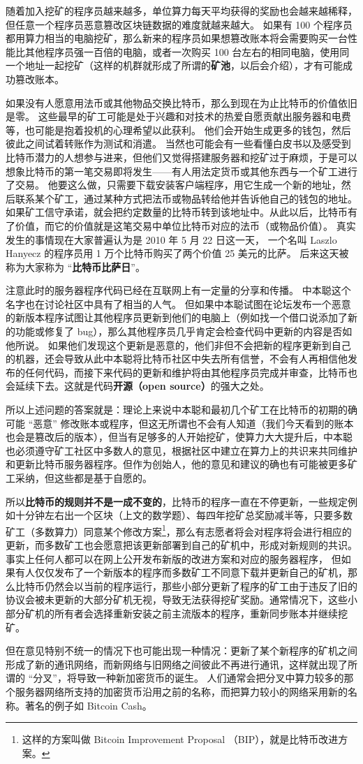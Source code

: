 随着加入挖矿的程序员越来越多，单位算力每天平均获得的奖励也会越来越稀释，但任意一个程序员恶意篡改区块链数据的难度就越来越大。 如果有 100 个程序员都用算力相当的电脑挖矿，那么新来的程序员如果想篡改账本将会需要购买一台性能比其他程序员强一百倍的电脑，或者一次购买 100 台左右的相同电脑，使用同一个地址一起挖矿（这样的机群就形成了所谓的\textbf{矿池}，以后会介绍），才有可能成功篡改账本。

如果没有人愿意用法币或其他物品交换比特币，那么到现在为止比特币的价值依旧是零。 这些最早的矿工可能是处于兴趣和对技术的热爱自愿贡献出服务器和电费等，也可能是抱着投机的心理希望以此获利。 他们会开始生成更多的钱包，然后彼此之间试着转账作为测试和消遣。 当然也可能会有一些看懂白皮书以及感受到比特币潜力的人想参与进来，但他们又觉得搭建服务器和挖矿过于麻烦，于是可以想象比特币的第一笔交易即将发生——有人用法定货币或其他东西与一个矿工进行了交易。 他要这么做，只需要下载安装客户端程序，用它生成一个新的地址，然后联系某个矿工，通过某种方式把法币或物品转给他并告诉他自己的钱包的地址。 如果矿工信守承诺，就会把约定数量的比特币转到该地址中。从此以后，比特币有了价值，而它的价值就是这笔交易中单位比特币对应的法币（或物品价值）。 真实发生的事情现在大家普遍认为是 2010 年 5 月 22 日这一天， 一个名叫 Laszlo Hanyecz 的程序员用 1 万个比特币购买了两个价值 25 美元的比萨。 后来这天被称为大家称为 “\textbf{比特币比萨日}”。

注意此时的服务器程序代码已经在互联网上有一定量的分享和传播。 中本聪这个名字也在讨论社区中具有了相当的人气。 但如果中本聪试图在论坛发布一个恶意的新版本程序试图让其他程序员更新到他们的电脑上（例如找一个借口说添加了新的功能或修复了 bug），那么其他程序员几乎肯定会检查代码中更新的内容是否如他所说。 如果他们发现这个更新是恶意的，他们非但不会把新的程序更新到自己的机器，还会导致从此中本聪将比特币社区中失去所有信誉，不会有人再相信他发布的任何代码，而接下来代码的更新和维护将由其他程序员完成并审查，比特币也会延续下去。这就是代码\textbf{开源（open source）}的强大之处。

所以上述问题的答案就是：理论上来说中本聪和最初几个矿工在比特币的初期的确可能 “恶意” 修改账本或程序，但这无所谓也不会有人知道（我们今天看到的账本也会是篡改后的版本），但当有足够多的人开始挖矿，使算力大大提升后，中本聪也必须遵守矿工社区中多数人的意见，根据社区中建立在算力上的共识来共同维护和更新比特币服务器程序。但作为创始人，他的意见和建议的确也有可能被更多矿工采纳，但这些都是基于自愿的。

所以\textbf{比特币的规则并不是一成不变的}，比特币的程序一直在不停更新，一些规定例如十分钟左右出一个区块（上文的数学题）、每四年挖矿总奖励减半等，只要多数矿工（多数算力）同意某个修改方案\footnote{这样的方案叫做 Bitcoin Improvement Proposal （BIP），就是比特币改进方案。}，那么有志愿者将会对程序将会进行相应的更新，而多数矿工也会愿意把该更新部署到自己的矿机中，形成对新规则的共识。 事实上任何人都可以在网上公开发布新版的改进方案和对应的服务器程序， 但如果有人仅仅发布了一个新版本的程序而多数矿工不同意下载并更新自己的矿机，那么比特币仍然会以当前的程序运行，那些小部分更新了程序的矿工由于违反了旧的协议会被未更新的大部分矿机无视，导致无法获得挖矿奖励。通常情况下，这些小部分矿机的所有者会选择重新安装之前主流版本的程序，重新同步账本并继续挖矿。

但在意见特别不统一的情况下也可能出现一种情况：更新了某个新程序的矿机之间形成了新的通讯网络，而新网络与旧网络之间彼此不再进行通讯，这样就出现了所谓的 “分叉”，将导致一种新加密货币的诞生。 人们通常会把分叉中算力较多的那个服务器网络所支持的加密货币沿用之前的名称，而把算力较小的网络采用新的名称。著名的例子如 Bitcoin Cash。

